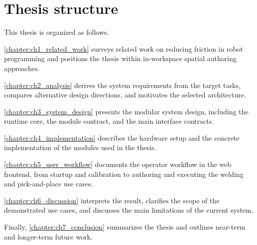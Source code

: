 \section*{Thesis structure}

This thesis is organized as follows.

\autoref{chapter:ch1_related_work} surveys related work on reducing friction in robot programming and positions the thesis within in-workspace spatial authoring approaches.

\autoref{chapter:ch2_analysis} derives the system requirements from the target tasks, compares alternative design directions, and motivates the selected architecture.

\autoref{chapter:ch3_system_design} presents the modular system design, including the runtime core, the module contract, and the main interface contracts.

\autoref{chapter:ch4_implementation} describes the \DIFdelbegin {}\DIFdelend hardware setup and the concrete implementation of the modules used in the thesis.

\autoref{chapter:ch5_user_workflow} documents the operator workflow in the web frontend, from startup and calibration to authoring and executing the welding and pick-and-place use cases.

\autoref{chapter:ch6_discussion} interprets the \DIFdelbegin {}\DIFdelend \DIFaddbegin {}\DIFaddend result, clarifies the scope of the demonstrated use cases, and discusses the main limitations of the current system.

Finally, \autoref{chapter:ch7_conclusion} summarizes the thesis and outlines near-term and longer-term future work.
